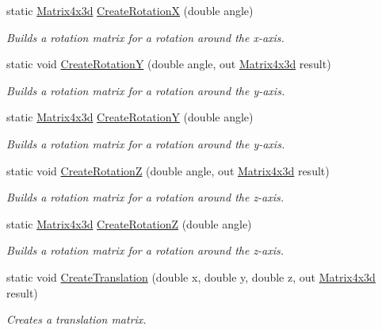 \begin{DoxyCompactItemize}
static \hyperlink{struct_open_t_k_1_1_matrix4x3d}{Matrix4x3d} \hyperlink{struct_open_t_k_1_1_matrix4x3d_a4882a8649f71daa883d9acd12fdca878}{Create\-Rotation\-X} (double angle)
\begin{DoxyCompactList}\small\item\em Builds a rotation matrix for a rotation around the x-\/axis. \end{DoxyCompactList}\item 
static void \hyperlink{struct_open_t_k_1_1_matrix4x3d_ac6de98f4f9f8c18fe7eb5687dedb0638}{Create\-Rotation\-Y} (double angle, out \hyperlink{struct_open_t_k_1_1_matrix4x3d}{Matrix4x3d} result)
\begin{DoxyCompactList}\small\item\em Builds a rotation matrix for a rotation around the y-\/axis. \end{DoxyCompactList}\item 
static \hyperlink{struct_open_t_k_1_1_matrix4x3d}{Matrix4x3d} \hyperlink{struct_open_t_k_1_1_matrix4x3d_a29eae7949613cb78f30bdd10daf387a0}{Create\-Rotation\-Y} (double angle)
\begin{DoxyCompactList}\small\item\em Builds a rotation matrix for a rotation around the y-\/axis. \end{DoxyCompactList}\item 
static void \hyperlink{struct_open_t_k_1_1_matrix4x3d_a1222e1ef50f038e1a105fcb633c71955}{Create\-Rotation\-Z} (double angle, out \hyperlink{struct_open_t_k_1_1_matrix4x3d}{Matrix4x3d} result)
\begin{DoxyCompactList}\small\item\em Builds a rotation matrix for a rotation around the z-\/axis. \end{DoxyCompactList}\item 
static \hyperlink{struct_open_t_k_1_1_matrix4x3d}{Matrix4x3d} \hyperlink{struct_open_t_k_1_1_matrix4x3d_a90210eb40dd218d323649a638f58eff6}{Create\-Rotation\-Z} (double angle)
\begin{DoxyCompactList}\small\item\em Builds a rotation matrix for a rotation around the z-\/axis. \end{DoxyCompactList}\item 
static void \hyperlink{struct_open_t_k_1_1_matrix4x3d_ab7181be2cbd6329ddff805eff2409725}{Create\-Translation} (double x, double y, double z, out \hyperlink{struct_open_t_k_1_1_matrix4x3d}{Matrix4x3d} result)
\begin{DoxyCompactList}\small\item\em Creates a translation matrix. \end{DoxyCompactList}\item 

\end{DoxyCompactItemize}
